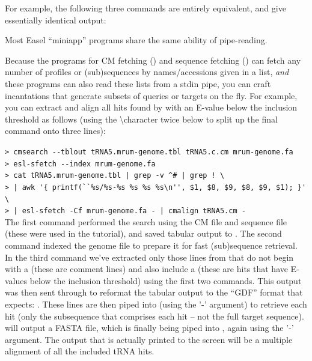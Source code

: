 For example, the following three commands are entirely equivalent, and
give essentially identical output:




Most Easel ``miniapp'' programs share the same ability of pipe-reading.

Because the programs for CM fetching () and
sequence fetching () can fetch any number of profiles
or (sub)sequences by names/accessions given in a list, \emph{and} these
programs can also read these lists from a stdin pipe, you can craft
incantations that generate subsets of queries or targets on the
fly. For example, you can extract and align all hits found by
 with an E-value below the inclusion threshold as 
follows (using the \textbackslash character twice below to split up the final
command onto three lines):

\indent\indent\small\verb+> cmsearch --tblout tRNA5.mrum-genome.tbl tRNA5.c.cm mrum-genome.fa+ \\
\indent\indent\small\verb+> esl-sfetch --index mrum-genome.fa+ \\
\indent\indent\small\verb+> cat tRNA5.mrum-genome.tbl | grep -v ^# | grep ! \ + \\
\indent\indent\small\verb+> | awk '{ printf(``%s/%s-%s %s %s %s\n'', $1, $8, $9, $8, $9, $1); }' \ + \\
\indent\indent\small\verb+> | esl-sfetch -Cf mrum-genome.fa - | cmalign tRNA5.cm - + \\

The first command performed the search using the CM file
 and sequence file  (these
were used in the tutorial), and saved tabular output to
.  The second command indexed the genome
file to prepare it for fast (sub)sequence retrieval. In the third
command we've extracted only those lines from
 that do not begin with a \prog{\#} (these
are comment lines) and also include a \prog{!} (these are hits that
have E-values below the inclusion threshold) using the first two
 commands. This output was then sent through  to
reformat the tabular output to the ``GDF'' format that
 expects: .  These lines are then piped into  (using
the '-' argument) to retrieve each hit (only the subsequence that
comprises each hit -- not the full target sequence). 
will output a FASTA file, which is finally being piped into
, again using the '-' argument. The output that is
actually printed to the screen will be a multiple alignment of all the
included tRNA hits.

